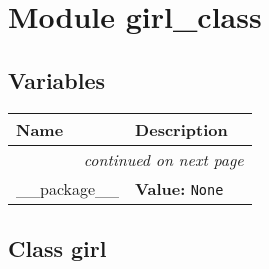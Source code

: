 %
%
%


\section{Module girl\_class}

    \label{girl_class}


  \subsection{Variables}

    \vspace{-1cm}
\hspace{\varindent}\begin{longtable}{|p{\varnamewidth}|p{\vardescrwidth}|l}
\cline{1-2}
\cline{1-2} \centering \textbf{Name} & \centering \textbf{Description}& \\
\cline{1-2}
\endhead\cline{1-2}\multicolumn{3}{r}{\small\textit{continued on next page}}\\\endfoot\cline{1-2}
\endlastfoot\raggedright \_\-\_\-p\-a\-c\-k\-a\-g\-e\-\_\-\_\- & \raggedright \textbf{Value:} 
{\tt None}&\\
\cline{1-2}
\end{longtable}



\subsection{Class girl}

    \label{girl_class:girl}

